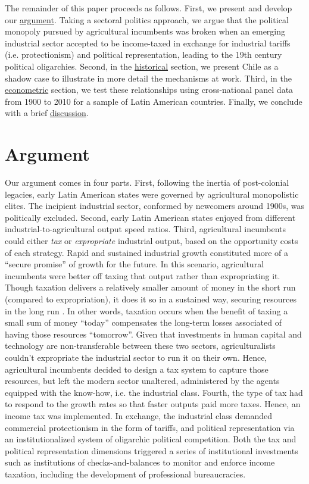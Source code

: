 \documentclass[onesided]{article}\usepackage[]{graphicx}\usepackage[]{color}
\begin{document}
The remainder of this paper proceeds as follows. First, we present and develop our \hyperref[argument]{argument}. Taking a sectoral politics approach, we argue that the political monopoly pursued by agricultural incumbents was broken when an emerging industrial sector accepted to be income-taxed in exchange for industrial tariffs (i.e. protectionism) and political representation, leading to the 19th century political oligarchies. Second, in the \hyperref[unpacking]{historical} section, we present Chile as a shadow case to illustrate in more detail the mechanisms at work. Third, in the \hyperref[methods]{econometric} section, we test these relationships using cross-national panel data from 1900 to 2010 for a sample of Latin American countries. Finally, we conclude with a brief \hyperref[discussion]{discussion}.


\section{Argument\label{argument}}

Our argument comes in four parts. %
First, following the inertia of post-colonial legacies, early Latin American states were governed by agricultural monopolistic elites. The incipient industrial sector, conformed by newcomers around 1900s, was politically excluded. %
Second, early Latin American states enjoyed from different industrial-to-agricultural output speed ratios. %
Third, agricultural incumbents could either \emph{tax} or \emph{expropriate}  industrial output, based on the opportunity costs of each strategy. Rapid and sustained industrial growth constituted more of a ``secure promise'' of growth for the future. In this scenario, agricultural incumbents were better off taxing that output rather than expropriating it. Though taxation delivers a relatively smaller amount of money in the short run (compared to expropriation), it does it so in a sustained way, securing resources in the long run . In other words, taxation occurs when the benefit of taxing a small sum of money ``today'' compensates the long-term losses associated of having those resources ``tomorrow''. Given that investments in human capital and technology are non-transferable between these two sectors, agriculturalists couldn't expropriate the industrial sector to run it on their own. Hence, agricultural incumbents decided to design a tax system to capture those resources, but left the modern sector unaltered, administered by the agents equipped with the know-how, i.e. the industrial class. %
Fourth, the type of tax had to respond to the growth rates so that faster outputs paid more taxes. Hence, an income tax was implemented. In exchange, the industrial class demanded commercial protectionism in the form of tariffs, and political representation via an institutionalized system of oligarchic political competition. Both the tax and political representation dimensions triggered a series of institutional investments such as institutions of checks-and-balances to monitor and enforce income taxation, including the development of professional bureaucracies.
\end{document}

